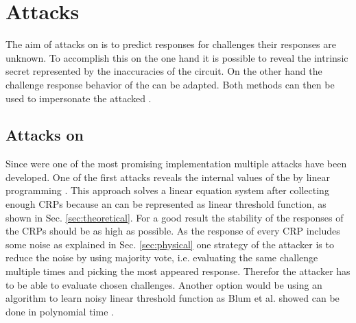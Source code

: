 \chapter{Attacks}
\label{cap:attacks}

The aim of attacks on \apuf is to predict responses for challenges their responses are unknown.
To accomplish this on the one hand it is possible to reveal the intrinsic secret represented by the inaccuracies of the \apuf circuit.
On the other hand the challenge response behavior of the \puf can be adapted.
Both methods can then be used to impersonate the attacked \puf.


\section{Attacks on \apufs}
\label{sec:attacksonarbiter}

Since \apufs were one of the most promising \puf implementation multiple attacks have been developed.
One of the first attacks reveals the internal values of the \apuf by linear programming \cite{Ozturk2008TowardsDevices}.
This approach solves a linear equation system after collecting enough \acp{CRP} because an \apuf can be represented as linear threshold function, as shown in Sec. \ref{sec:theoretical}.
For a good result the stability of the responses of the \acp{CRP} should be as high as possible.
As the response of every \ac{CRP} includes some noise as explained in Sec. \ref{sec:physical} one strategy of the attacker is to reduce the noise by using majority vote, i.e. evaluating the same challenge multiple times and picking the most appeared response.
Therefor the attacker has to be able to evaluate chosen challenges.
Another option would be using an algorithm to learn noisy linear threshold function as Blum et al. showed can be done in polynomial time \cite{Blum1998AlgorithmicaNoisy}.

